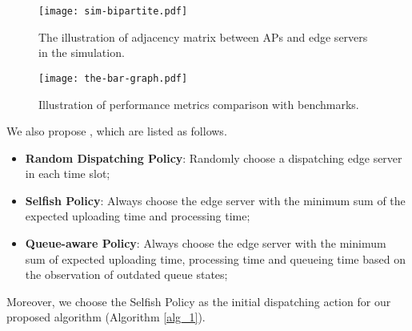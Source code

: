 \begin{figure}[ht]                                                      %
    \centering                                                          %
    \texttt{[image: sim-bipartite.pdf]}   %
    \caption{The illustration of adjacency matrix between APs and edge servers in the simulation.}
    \label{fig:bipartite}                                                %
\end{figure}                                                            %

\begin{figure}[ht]                                                      %
    \centering                                                          %
    \texttt{[image: the-bar-graph.pdf]}           %
    \caption{Illustration of performance metrics comparison with benchmarks.}
    \label{fig:bar_plot}                                                %
\end{figure}                                                            %

We also propose , which are listed as follows.
\begin{itemize}
    \item \textbf{Random Dispatching Policy}:
            Randomly choose a dispatching edge server in each time slot; 
    \item \textbf{Selfish Policy}:
            Always choose the edge server with the minimum sum of the expected uploading time and processing time;
    \item \textbf{Queue-aware Policy}:
            Always choose the edge server with the minimum sum of expected uploading time, processing time and queueing time based on the observation of outdated queue states;
\end{itemize}
Moreover, we choose the Selfish Policy as the initial dispatching action for our proposed algorithm (Algorithm \ref{alg_1}).

